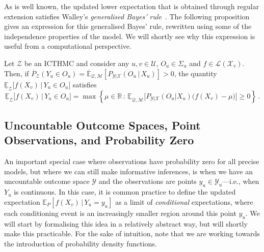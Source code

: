 \documentclass[twoside,11pt]{article}
\newcommand{\reals}{\mathbb{R}}
\newcommand{\states}{\mathcal{X}}
\newcommand{\observs}{\mathcal{Y}}
\newcommand{\lexp}{\underline{\mathbb{E}}_{\rateset,\mathcal{M}}}
\newcommand{\uexp}{\overline{\mathbb{E}}_{\rateset,\mathcal{M}}}
\newcommand{\gambles}{\mathcal{L}}
\newcommand{\rateset}{\mathcal{Q}}
\begin{document}
As is well known, the updated lower expectation that is obtained through regular extension satisfies Walley's \emph{generalised Bayes' rule}~\citep{Walley:1991vk}. The following proposition gives an expression for this generalised Bayes' rule, rewritten using some of the independence properties of the model. We will shortly see why this expression is useful from a computational perspective.
\begin{proposition}\label{prop:GBR_regular}
Let $\mathcal{Z}$ be an ICTHMC and consider any $u,v\in\mathcal{U}$, $O_u\in\Sigma_u$ and $f\in\gambles(\states_v)$. Then, if $\overline{P}_\mathcal{Z}(Y_u\in O_u) = \uexp[P_{\observs\vert\states}(O_u\,\vert\,X_u)] > 0$, the quantity $\underline{\mathbb{E}}_{\mathcal{Z}}\bigl[f(X_v)\,\vert\,Y_u\in O_u\bigr]$ satisfies
\begin{equation*}
\underline{\mathbb{E}}_{\mathcal{Z}}\bigl[f(X_v)\,\vert\,Y_u\in O_u\bigr] = \max\left\{\mu\in\reals\,:\, \lexp\bigl[P_{\observs\vert\states}(O_u\vert X_u)\bigl(f(X_v) - \mu\bigr)\bigr] \geq 0\right\}\,.
\end{equation*}
\end{proposition}

\subsection{Uncountable Outcome Spaces, Point Observations, and Probability Zero}\label{subsec:uncountable}

An important special case where observations have probability zero for all precise models, but where we can still make informative inferences, is when we have an uncountable outcome space $\observs$ and the observations are points $y_u\in\observs_u$---i.e., when $Y_u$ is continuous. In this case, it is common practice to define the updated expectation $\mathbb{E}_P[f(X_v)\,\vert\,Y_u=y_u]$ as a limit of \emph{conditional} expectations, where each conditioning event is an increasingly smaller region around this point $y_u$. We will start by formalising this idea in a relatively abstract way, but will shortly make this practicable. For the sake of intuition, note that we are working towards the introduction of probability density functions.
\end{document}
